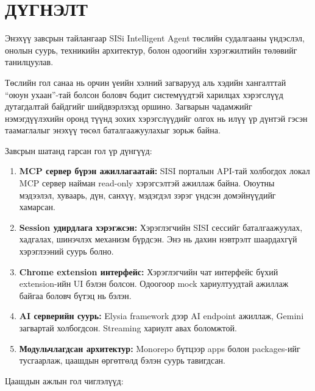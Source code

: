 \documentclass[12pt,a4paper]{report}
\begin{document}








\chapter*{ДҮГНЭЛТ}

Энэхүү завсрын тайлангаар SISi Intelligent Agent төслийн судалгааны үндэслэл, онолын суурь, техникийн архитектур, болон одоогийн хэрэгжилтийн төлөвийг танилцуулав.

Төслийн гол санаа нь орчин үеийн хэлний загварууд аль хэдийн хангалттай ``оюун ухаан''-тай болсон боловч бодит системүүдтэй харилцах хэрэгслүүд дутагдалтай байдгийг шийдвэрлэхэд оршино. Загварын чадамжийг нэмэгдүүлэхийн оронд түүнд зохих хэрэгслүүдийг олгох нь илүү үр дүнтэй гэсэн таамаглалыг энэхүү төсөл баталгаажуулахыг зорьж байна.

Завсрын шатанд гарсан гол үр дүнгүүд:

\begin{enumerate}
  \item \textbf{MCP сервер бүрэн ажиллагаатай:} SISI порталын API-тай холбогдох локал MCP сервер найман read-only хэрэгсэлтэй ажиллаж байна. Оюутны мэдээлэл, хуваарь, дүн, санхүү, мэдэгдэл зэрэг үндсэн домэйнүүдийг хамарсан.
  
  \item \textbf{Session удирдлага хэрэгжсэн:} Хэрэглэгчийн SISI сессийг баталгаажуулах, хадгалах, шинэчлэх механизм бүрдсэн. Энэ нь дахин нэвтрэлт шаардахгүй хэрэглээний суурь болно.
  
  \item \textbf{Chrome extension интерфейс:} Хэрэглэгчийн чат интерфейс бүхий extension-ийн UI бэлэн болсон. Одоогоор mock хариултуудтай ажиллаж байгаа боловч бүтэц нь бэлэн.
  
  \item \textbf{AI серверийн суурь:} Elysia framework дээр AI endpoint ажиллаж, Gemini загвартай холбогдсон. Streaming хариулт авах боломжтой.
  
  \item \textbf{Модульчлагдсан архитектур:} Monorepo бүтцээр apps болон packages-ийг тусгаарлаж, цаашдын өргөтгөлд бэлэн суурь тавигдсан.
\end{enumerate}

Цаашдын ажлын гол чиглэлүүд:
\end{document}
